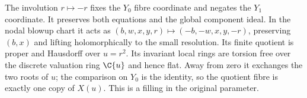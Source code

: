 \item The involution $r\mapsto-r$ fixes the $Y_0$ fibre coordinate and negates the $Y_1$ coordinate. It preserves both equations and the global component ideal. In the nodal blowup chart it acts as $(b,w,x,y,r)\mapsto(-b,-w,x,y,-r)$, preserving $(b,x)$ and lifting holomorphically to the small resolution. Its finite quotient is proper and Hausdorff over $u=r^2$. Its invariant local rings are torsion free over the discrete valuation ring $\C\{u\}$ and hence flat. Away from zero it exchanges the two roots of $u$; the comparison on $Y_0$ is the identity, so the quotient fibre is exactly one copy of $X(u)$. This is a filling in the original parameter.

